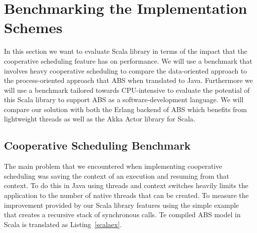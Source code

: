 \section{Benchmarking the Implementation Schemes}
\label{bench}

In this section we want to evaluate Scala library in terms of the impact that the cooperative scheduling feature has on performance. We will use a benchmark that involves heavy cooperative scheduling to compare the data-oriented approach to the process-oriented approach that ABS when translated to Java. Furthermore we will use a benchmark tailored towards CPU-intensive to evaluate the potential of this Scala library to support ABS as a software-development language. We will compare our solution with both the Erlang backend of ABS which benefits from lightweight threads as well as the Akka Actor library for Scala.

\subsection{Cooperative Scheduling Benchmark}
The main problem that we encountered when implementing cooperative scheduling was saving the context of an execution and resuming from that context. To do this in Java using threads and context switches heavily limits the application to the number of native threads that can be created.  To measure the improvement provided by our Scala library features using the simple example that creates a recursive stack of synchronous calls.  Te compiled ABS model in Scala is translated as Listing~\ref{scalaex}.


